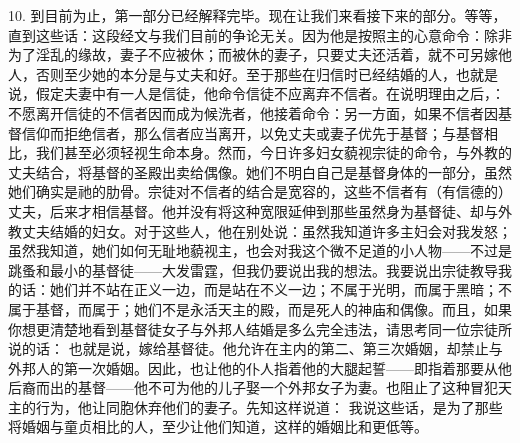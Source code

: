 10. 到目前为止，第一部分已经解释完毕。现在让我们来看接下来的部分。等等，直到这些话：这段经文与我们目前的争论无关。因为他是按照主的心意命令：除非为了淫乱的缘故，妻子不应被休；而被休的妻子，只要丈夫还活着，就不可另嫁他人，否则至少她的本分是与丈夫和好。至于那些在归信时已经结婚的人，也就是说，假定夫妻中有一人是信徒，他命令信徒不应离弃不信者。在说明理由之后，：不愿离开信徒的不信者因而成为候洗者，他接着命令：另一方面，如果不信者因基督信仰而拒绝信者，那么信者应当离开，以免丈夫或妻子优先于基督；与基督相比，我们甚至必须轻视生命本身。然而，今日许多妇女藐视宗徒的命令，与外教的丈夫结合，将基督的圣殿出卖给偶像。她们不明白自己是基督身体的一部分，虽然她们确实是祂的肋骨。宗徒对不信者的结合是宽容的，这些不信者有（有信德的）丈夫，后来才相信基督。他并没有将这种宽限延伸到那些虽然身为基督徒、却与外教丈夫结婚的妇女。对于这些人，他在别处说：虽然我知道许多主妇会对我发怒；虽然我知道，她们如何无耻地藐视主，也会对我这个微不足道的小人物——不过是跳蚤和最小的基督徒——大发雷霆，但我仍要说出我的想法。我要说出宗徒教导我的话：她们并不站在正义一边，而是站在不义一边；不属于光明，而属于黑暗；不属于基督，而属于；她们不是永活天主的殿，而是死人的神庙和偶像。而且，如果你想更清楚地看到基督徒女子与外邦人结婚是多么完全违法，请思考同一位宗徒所说的话： 也就是说，嫁给基督徒。他允许在主内的第二、第三次婚姻，却禁止与外邦人的第一次婚姻。因此，也让他的仆人指着他的大腿起誓——即指着那要从他后裔而出的基督——他不可为他的儿子娶一个外邦女子为妻。也阻止了这种冒犯天主的行为，他让同胞休弃他们的妻子。先知这样说道： 我说这些话，是为了那些将婚姻与童贞相比的人，至少让他们知道，这样的婚姻比和更低等。\par

